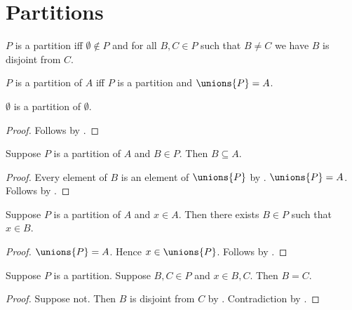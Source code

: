 

\section{Partitions}

\begin{definition}\label{partition}
    $P$ is a partition iff
    $\emptyset\notin P$ and
    for all $B, C\in P$ such that $B\neq C$ we have $B$ is disjoint from $C$.
\end{definition}

\begin{abbreviation}\label{partition_of}
    $P$ is a partition of $A$ iff
    $P$ is a partition and
    $\unions{P} = A$.
\end{abbreviation}

\begin{proposition}\label{partition_emptyset}
    $\emptyset$ is a partition of $\emptyset$.
\end{proposition}
\begin{proof}
    Follows by .
\end{proof}

\begin{proposition}\label{partition_block_subseteq}
    Suppose $P$ is a partition of $A$ and $B\in P$.
    Then $B\subseteq A$.
\end{proposition}
\begin{proof}
    Every element of $B$ is an element of $\unions{P}$
        by .
    $\unions{P}=A$.
    Follows by .
\end{proof}

\begin{proposition}\label{partition_block_exists}
    Suppose $P$ is a partition of $A$ and $x\in A$.
    Then there exists $B\in P$ such that $x\in B$.
\end{proposition}
\begin{proof}
    $\unions{P}=A$.
    Hence $x\in\unions{P}$.
    Follows by .
\end{proof}

\begin{proposition}\label{partition_block_unique}
    Suppose $P$ is a partition.
    Suppose $B,C\in P$ and $x\in B,C$.
    Then $B=C$.
\end{proposition}
\begin{proof}
    Suppose not.
    Then $B$ is disjoint from $C$ by .
    Contradiction by .
\end{proof}

